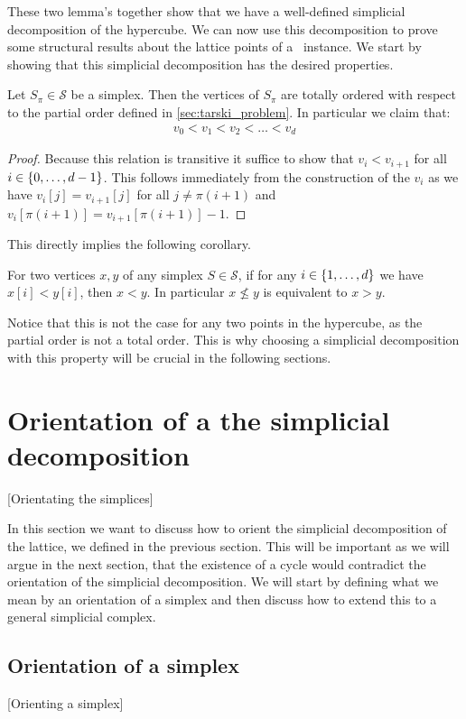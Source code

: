 These two lemma's together show that we have a well-defined simplicial decomposition of the hypercube. We can now use this decomposition to prove some structural results about the lattice points of a \Tarski\ instance. We start by showing that this simplicial decomposition has the desired properties.
\begin{lemma}
    Let $S_{\pi} \in \mathcal{S}$ be a simplex. Then the vertices of $S_{\pi}$ are totally ordered with respect to the partial order defined in \cref{sec:tarski_problem}. In particular we claim that:
    \begin{align*}
        v_0 < v_1 < v_2 < \dots < v_d
    \end{align*}
\end{lemma}
\begin{proof}
    Because this relation is transitive it suffice to show that $v_i < v_{i+1}$ for all $i \in \left\{0, \dots, d-1\right\}$. This follows immediately from the construction of the $v_i$ as we have $v_i[j] = v_{i+1}[j]$ for all $j \neq \pi(i+1)$ and $v_i[\pi(i+1)] = v_{i+1}[\pi(i+1)] - 1$.
\end{proof}
This directly implies the following corollary.
\begin{corollary}
    \label{cor:total_ordering}
    For two vertices $x,y$ of any simplex $S \in \mathcal{S}$, if for any $i \in \left\{1, \dots, d\right\}$ we have $x[i] < y[i]$, then $x < y$. In particular $x \not\leq y$ is equivalent to $x > y$.
\end{corollary}
Notice that this is not the case for any two points in the hypercube, as the partial order is not a total order. This is why choosing a simplicial decomposition with this property will be crucial in the following sections.

\section{Orientation of a the simplicial decomposition}[Orientating the simplices]

In this section we want to discuss how to orient the simplicial decomposition of the lattice, we defined in the previous section. This will be important as we will argue in the next section, that the existence of a cycle would contradict the orientation of the simplicial decomposition. We will start by defining what we mean by an orientation of a simplex and then discuss how to extend this to a general simplicial complex.

\subsection{Orientation of a simplex}[Orienting a simplex]

